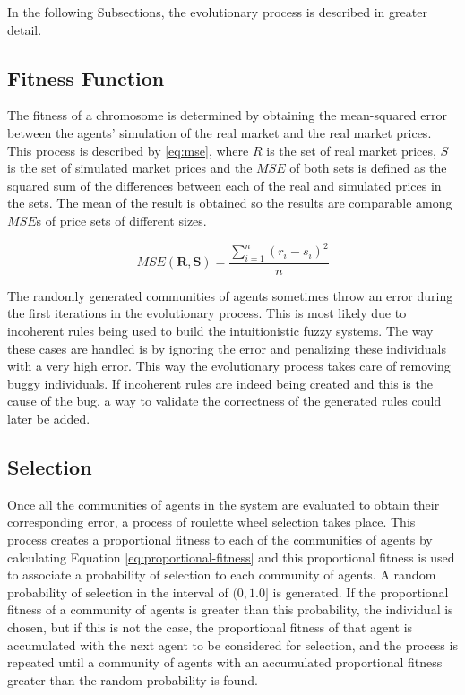 
In the following Subsections, the evolutionary process is described in greater
detail.

\subsection{Fitness Function}
\label{subsection:fitness-function}

The fitness of a chromosome is determined by obtaining the mean-squared error
between the agents' simulation of the real market and the real market
prices. This process is described by \ref{eq:mse}, where $R$ is the set of real
market prices, $S$ is the set of simulated market prices and the $MSE$ of both
sets is defined as the squared sum of the differences between each of the real and
simulated prices in the sets. The mean of the result is obtained so the results
are comparable among $MSE$s of price sets of different sizes.

\begin{equation}
  \label{eq:mse}
  MSE(\bm{R}, \bm{S}) = \frac{\sum_{i=1}^n(r_i-s_i)^2}{n}
\end{equation}

The randomly generated communities of agents sometimes throw an error during the
first iterations in the evolutionary process. This is most likely due to
incoherent rules being used to build the intuitionistic fuzzy systems. The way
these cases are handled is by ignoring the error and penalizing these
individuals with a very high error. This way the evolutionary process takes care
of removing buggy individuals. If incoherent rules are indeed being created and
this is the cause of the bug, a way to validate the correctness of the generated
rules could later be added.

\subsection{Selection}
\label{subsection:selection}

Once all the communities of agents in the system are evaluated to obtain their
corresponding error, a process of roulette wheel selection takes place. This
process creates a proportional fitness to each of the communities of agents by
calculating Equation \ref{eq:proportional-fitness} and this proportional fitness is used
to associate a probability of selection to each community of agents. A random
probability of selection in the interval of
$(0, 1.0]$ is generated. If the proportional fitness of a community of agents is
greater than this probability, the individual is chosen, but if this is not the
case, the proportional fitness of that agent is accumulated with the next agent
to be considered for selection, and the process is repeated until a community of
agents with an accumulated proportional fitness greater than the random
probability is found.

